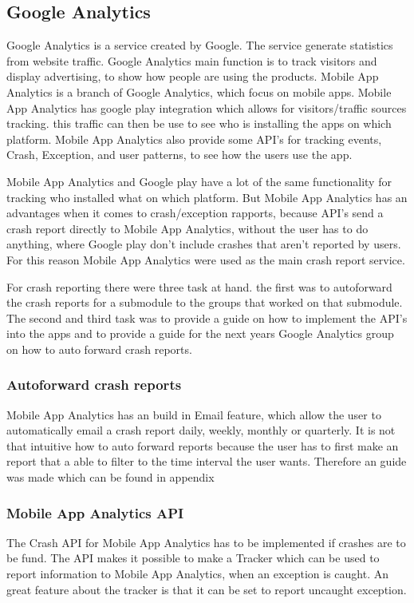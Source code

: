 \subsection{Google Analytics}
Google Analytics is a service created by Google. The service generate statistics from website traffic. Google Analytics main function is to track visitors and display advertising, to show how people are using the products. Mobile App Analytics is a branch of  Google Analytics, which focus on mobile apps. Mobile App Analytics has google play integration which allows for visitors/traffic sources tracking. this traffic can then be use to see who is installing the apps on which platform. Mobile App Analytics also provide some API’s for tracking events, Crash, Exception, and user patterns, to see how the users use the app.

Mobile App Analytics and Google play have a lot of the same functionality for tracking who installed what on which platform. But Mobile App Analytics has an advantages when it comes to crash/exception rapports, because API’s send a crash report directly to Mobile App Analytics, without the user has to do anything, where Google play don’t include crashes that aren’t reported by users. For this reason Mobile App Analytics were used as the main crash report service.  

For crash reporting there were three task at hand. the first was to autoforward the crash reports for a submodule to the groups that worked on that submodule. The second and third task was to provide a guide on how to implement the API’s into the apps and to provide a guide for the next years Google Analytics group on how to auto forward crash reports. 

\subsubsection{Autoforward crash reports}
Mobile App Analytics has an build in Email feature, which allow the user to automatically email a crash report daily, weekly, monthly or quarterly. It is not that intuitive how to auto forward reports because the user has to first make an report that a able to filter to the time interval the user wants. Therefore an guide was made which can be found in appendix \citep{ChapCrashReport}

\subsubsection{Mobile App Analytics API}
The Crash API for Mobile App Analytics has to be implemented if crashes are to be fund. The API makes it possible to make a Tracker which can be used to report information to Mobile App Analytics, when an exception is caught. An great feature about the tracker is that it can be set to report uncaught exception.    